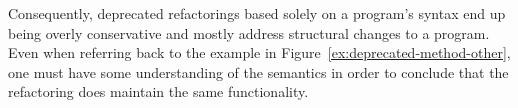 \documentclass[runningheads,a4paper]{llncs}
\begin{document}
Consequently, deprecated refactorings based solely on a program's syntax end up
being overly conservative and mostly address structural changes
to a program.  Even when referring back to the example in
Figure~\ref{ex:deprecated-method-other}, one must have some
understanding of the semantics in order to conclude that the
refactoring does maintain the same functionality.
%
%
%
%
%
\end{document}
